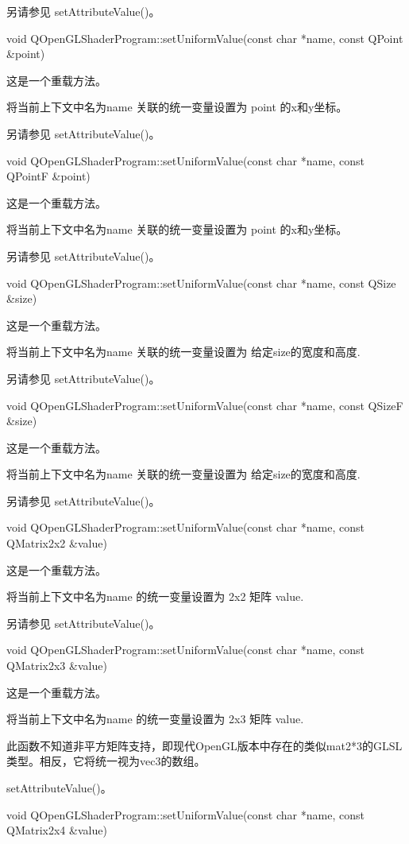 另请参见 setAttributeValue()。

void QOpenGLShaderProgram::setUniformValue(const char *name, const QPoint \&point)

这是一个重载方法。

将当前上下文中名为name 关联的统一变量设置为 point 的x和y坐标。

另请参见 setAttributeValue()。

void QOpenGLShaderProgram::setUniformValue(const char *name, const QPointF \&point)

这是一个重载方法。

将当前上下文中名为name 关联的统一变量设置为 point 的x和y坐标。

另请参见 setAttributeValue()。

void QOpenGLShaderProgram::setUniformValue(const char *name, const QSize \&size)

这是一个重载方法。

将当前上下文中名为name 关联的统一变量设置为 给定size的宽度和高度.

另请参见 setAttributeValue()。

void QOpenGLShaderProgram::setUniformValue(const char *name, const QSizeF \&size)

这是一个重载方法。

将当前上下文中名为name 关联的统一变量设置为 给定size的宽度和高度.

另请参见 setAttributeValue()。

void QOpenGLShaderProgram::setUniformValue(const char *name, const QMatrix2x2 \&value)

这是一个重载方法。

将当前上下文中名为name 的统一变量设置为 2x2 矩阵 value.

另请参见 setAttributeValue()。

void QOpenGLShaderProgram::setUniformValue(const char *name, const QMatrix2x3 \&value)

这是一个重载方法。

将当前上下文中名为name 的统一变量设置为 2x3 矩阵 value.

\begin{notice}
此函数不知道非平方矩阵支持，即现代OpenGL版本中存在的类似mat2*3的GLSL类型。相反，它将统一视为vec3的数组。
\end{notice}

\begin{seeAlso}
setAttributeValue()。
\end{seeAlso}

void QOpenGLShaderProgram::setUniformValue(const char *name, const QMatrix2x4 \&value)

